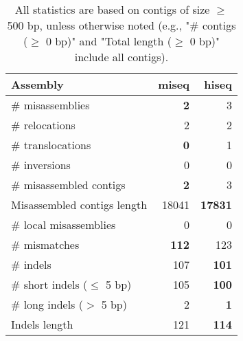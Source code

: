 \documentclass[12pt,a4paper]{article}
\begin{document}
\begin{table}[ht]
\begin{center}
\caption{All statistics are based on contigs of size $\geq$ 500 bp, unless otherwise noted (e.g., "\# contigs ($\geq$ 0 bp)" and "Total length ($\geq$ 0 bp)" include all contigs).}
\begin{tabular}{|l*{2}{|r}|}
\hline
Assembly & miseq & hiseq \\ \hline
\# misassemblies & {\bf 2} & 3 \\ \hline
\hspace{5mm}\# relocations & 2 & 2 \\ \hline
\hspace{5mm}\# translocations & {\bf 0} & 1 \\ \hline
\hspace{5mm}\# inversions & 0 & 0 \\ \hline
\# misassembled contigs & {\bf 2} & 3 \\ \hline
Misassembled contigs length & 18041 & {\bf 17831} \\ \hline
\# local misassemblies & 0 & 0 \\ \hline
\# mismatches & {\bf 112} & 123 \\ \hline
\# indels & 107 & {\bf 101} \\ \hline
\hspace{5mm}\# short indels ($\leq$ 5 bp) & 105 & {\bf 100} \\ \hline
\hspace{5mm}\# long indels ($>$ 5 bp) & 2 & {\bf 1} \\ \hline
Indels length & 121 & {\bf 114} \\ \hline
\end{tabular}
\end{center}
\end{table}
\end{document}
